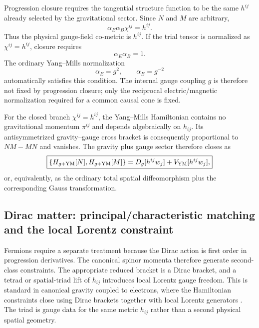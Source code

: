 \documentclass[11pt]{article}
\begin{document}
Progression closure requires the tangential structure function to be the same $h^{ij}$ already selected by the gravitational sector. Since $N$ and $M$ are arbitrary,
\begin{equation}
\boxed{
\alpha_E\alpha_B\chi^{ij}=h^{ij}.}
\label{eq:YM_closure_condition}
\end{equation}
Thus the physical gauge-field co-metric is $h^{ij}$. If the trial tensor is normalized as $\chi^{ij}=h^{ij}$, closure requires
\begin{equation}
    \alpha_E\alpha_B=1.
\end{equation}
The ordinary Yang--Mills normalization
\begin{equation}
    \alpha_E=g^2,
    \qquad
    \alpha_B=g^{-2}
\end{equation}
automatically satisfies this condition. The internal gauge coupling $g$ is therefore not fixed by progression closure; only the reciprocal electric/magnetic normalization required for a common causal cone is fixed.

For the closed branch $\chi^{ij}=h^{ij}$, the Yang--Mills Hamiltonian contains no gravitational momentum $\pi^{ij}$ and depends algebraically on $h_{ij}$. Its antisymmetrized gravity--gauge cross bracket is consequently proportional to $NM-MN$ and vanishes. The gravity plus gauge sector therefore closes as
\begin{equation}
\boxed{
\{H_{g+{\rm YM}}[N],H_{g+{\rm YM}}[M]\}
=D_g[h^{ij}w_j]+V_{\rm YM}[h^{ij}w_j],}
\label{eq:gravity_YM_closure}
\end{equation}
or, equivalently, as the ordinary total spatial diffeomorphism plus the corresponding Gauss transformation.

\subsection{Dirac matter: principal/characteristic matching and the local Lorentz constraint}
\label{subsec:Dirac_closure}

Fermions require a separate treatment because the Dirac action is first order in progression derivatives. The canonical spinor momenta therefore generate second-class constraints. The appropriate reduced bracket is a Dirac bracket, and a tetrad or spatial-triad lift of $h_{ij}$ introduces local Lorentz gauge freedom. This is standard in canonical gravity coupled to electrons, where the Hamiltonian constraints close using Dirac brackets together with local Lorentz generators \cite{NelsonTeitelboim1978}. The triad is gauge data for the same metric $h_{ij}$ rather than a second physical spatial geometry.
\end{document}
